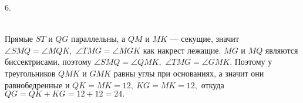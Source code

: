 6. \begin{figure}[ht!]
\end{figure}\\
Прямые $ST$ и $QG$ параллельны, а $QM$ и $MK$ --- секущие, значит $\angle SMQ = \angle MQK,$  $\angle TMG= \angle MGK$ как накрест лежащие. $MG$ и $MQ$ являются биссектрисами, поэтому $\angle SMQ = \angle QMK,$ $ \angle TMG= \angle GMK.$ Поэтому у треугольников $QMK$ и $GMK$ равны углы при основаниях, а значит они равнобедренные и $QK=MK=12,\ KG=MK=12,$ откуда $QG=QK+KG=12+12=24.$\\
